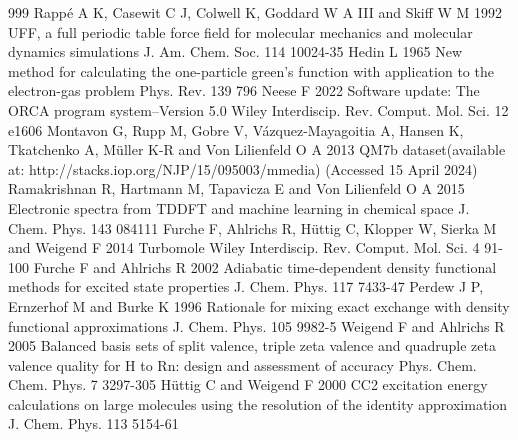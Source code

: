 \documentclass[12pt]{article}
\begin{document}
\begin{thebibliography}{999}
 Rappé A K, Casewit C J, Colwell K, Goddard W A III and Skiff W M 1992 UFF, a full periodic table force field for molecular mechanics and molecular dynamics simulations J. Am. Chem. Soc. 114 10024-35
 Hedin L 1965 New method for calculating the one-particle green's function with application to the electron-gas problem Phys. Rev. 139 796
 Neese F 2022 Software update: The ORCA program system--Version 5.0 Wiley Interdiscip. Rev. Comput. Mol. Sci. 12 e1606
 Montavon G, Rupp M, Gobre V, Vázquez-Mayagoitia A, Hansen K, Tkatchenko A, Müller K-R and Von Lilienfeld O A 2013 QM7b dataset(available at: http://stacks.iop.org/NJP/15/095003/mmedia) (Accessed 15 April 2024)
 Ramakrishnan R, Hartmann M, Tapavicza E and Von Lilienfeld O A 2015 Electronic spectra from TDDFT and machine learning in chemical space J. Chem. Phys. 143 084111
 Furche F, Ahlrichs R, Hüttig C, Klopper W, Sierka M and Weigend F 2014 Turbomole Wiley Interdiscip. Rev. Comput. Mol. Sci. 4 91-100
 Furche F and Ahlrichs R 2002 Adiabatic time-dependent density functional methods for excited state properties J. Chem. Phys. 117 7433-47
 Perdew J P, Ernzerhof M and Burke K 1996 Rationale for mixing exact exchange with density functional approximations J. Chem. Phys. 105 9982-5
 Weigend F and Ahlrichs R 2005 Balanced basis sets of split valence, triple zeta valence and quadruple zeta valence quality for H to Rn: design and assessment of accuracy Phys. Chem. Chem. Phys. 7 3297-305
 Hüttig C and Weigend F 2000 CC2 excitation energy calculations on large molecules using the resolution of the identity approximation J. Chem. Phys. 113 5154-61
\end{thebibliography}
\end{document}
